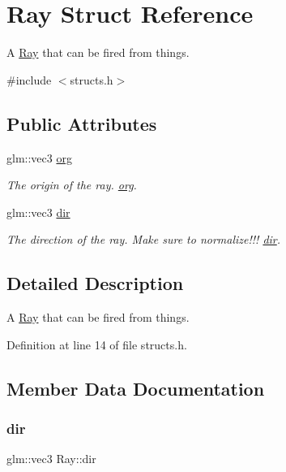 \hypertarget{struct_ray}{}\section{Ray Struct Reference}
\label{struct_ray}


A \mbox{\hyperlink{struct_ray}{Ray}} that can be fired from things.  




{\ttfamily \#include $<$structs.\+h$>$}

\subsection*{Public Attributes}
\begin{DoxyCompactItemize}
\item 
glm\+::vec3 \mbox{\hyperlink{struct_ray_a37337cf8775a751e2d58de86ffccebec}{org}}
\begin{DoxyCompactList}\small\item\em The origin of the ray. \mbox{\hyperlink{struct_ray_a37337cf8775a751e2d58de86ffccebec}{org}}. \end{DoxyCompactList}\item 
glm\+::vec3 \mbox{\hyperlink{struct_ray_a666e66ac32a5462ae95161a361e91951}{dir}}
\begin{DoxyCompactList}\small\item\em The direction of the ray. Make sure to normalize!!! \mbox{\hyperlink{struct_ray_a666e66ac32a5462ae95161a361e91951}{dir}}. \end{DoxyCompactList}\end{DoxyCompactItemize}


\subsection{Detailed Description}
A \mbox{\hyperlink{struct_ray}{Ray}} that can be fired from things. 

Definition at line 14 of file structs.\+h.



\subsection{Member Data Documentation}
\mbox{\label{struct_ray_a666e66ac32a5462ae95161a361e91951}} 
\subsubsection{\texorpdfstring{dir}{dir}}
{\footnotesize\ttfamily glm\+::vec3 Ray\+::dir}



